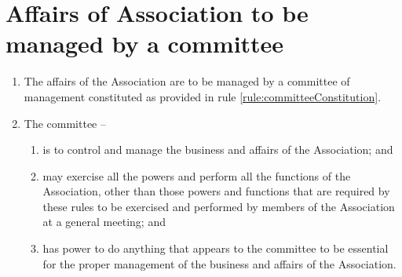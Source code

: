 \section{Affairs of Association to be managed by a committee}
\label{rule:committeeAffairs}

\begin{enumerate}
	\item The affairs of the Association are to be managed by a committee of management constituted as provided in rule \ref{rule:committeeConstitution}.

	\item The committee --
	\begin{enumerate}
		\item is to control and manage the business and affairs of the Association; and
		\item may exercise all the powers and perform all the functions of the Association, other than those powers and functions that are required by these rules to be exercised and performed by members of the Association at a general meeting; and
		\item has power to do anything that appears to the committee to be essential for the proper management of the business and affairs of the Association.
	\end{enumerate}
\end{enumerate}